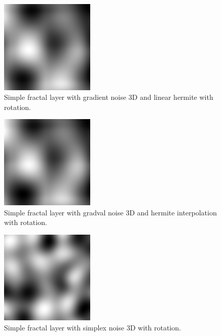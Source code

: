 \begin{figure}[h]
\centering
\includegraphics[width=0.4\textwidth]{out/simpleFractalLayer3/simpleFractalLayer3_gradient_noise3D_hermiteInterp_rot.png}
\caption{Simple fractal layer with gradient noise 3D and linear hermite with rotation.}
\label{fig:simple_fractal_layer3_gradient_noise3D_hermiteInterp_rot}
\end{figure}

\begin{figure}[h]
\centering
\includegraphics[width=0.4\textwidth]{out/simpleFractalLayer3/simpleFractalLayer3_gradval_noise3D_hermiteInterp_rot.png}
\caption{Simple fractal layer with gradval noise 3D and hermite interpolation with rotation.}
\label{fig:simple_fractal_layer3_gradval_noise3D_hermiteInterp_rot}
\end{figure}

\begin{figure}[h]
\centering
\includegraphics[width=0.4\textwidth]{out/simpleFractalLayer3/simpleFractalLayer3_simplex_noise3D_noInterp_rot.png}
\caption{Simple fractal layer with simplex noise 3D with rotation.}
\label{fig:simple_fractal_layer3_simplex_noise3D_noInterp_rot}
\end{figure}

